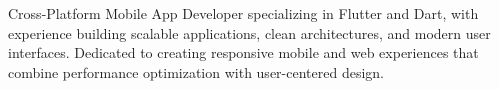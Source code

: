 %
%
%
\par{
Cross-Platform Mobile App Developer specializing in Flutter and Dart, with experience building scalable applications, clean architectures, and modern user interfaces. Dedicated to creating responsive mobile and web experiences that combine performance optimization with user-centered design.
}